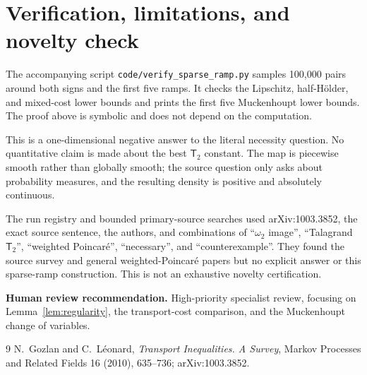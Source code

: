 \documentclass[11pt]{article}
\newcommand{\Ttwo}{\mathsf{T}_2}
\begin{document}
\section{Verification, limitations, and novelty check}

The accompanying script \texttt{code/verify\_sparse\_ramp.py} samples
100,000 pairs around both signs and the first five ramps.  It checks the
Lipschitz, half-H\"older, and mixed-cost lower bounds and prints the first five
Muckenhoupt lower bounds.  The proof above is symbolic and does not depend on
the computation.

This is a one-dimensional negative answer to the literal necessity question.
No quantitative claim is made about the best $\Ttwo$ constant.  The map is
piecewise smooth rather than globally smooth; the source question only asks
about probability measures, and the resulting density is positive and
absolutely continuous.

The run registry and bounded primary-source searches used arXiv:1003.3852,
the exact source sentence, the authors, and combinations of
``$\omega_2$ image'', ``Talagrand $\Ttwo$'', ``weighted Poincar\'e'',
``necessary'', and ``counterexample''.  They found the source survey and
general weighted-Poincar\'e papers but no explicit answer or this sparse-ramp
construction.  This is not an exhaustive novelty certification.

\medskip
\noindent\textbf{Human review recommendation.}
High-priority specialist review, focusing on Lemma~\ref{lem:regularity}, the
transport-cost comparison, and the Muckenhoupt change of variables.

\begin{thebibliography}{9}
N.~Gozlan and C.~L\'eonard,
\emph{Transport Inequalities. A Survey},
Markov Processes and Related Fields 16 (2010), 635--736;
arXiv:1003.3852.
\end{thebibliography}
\end{document}

